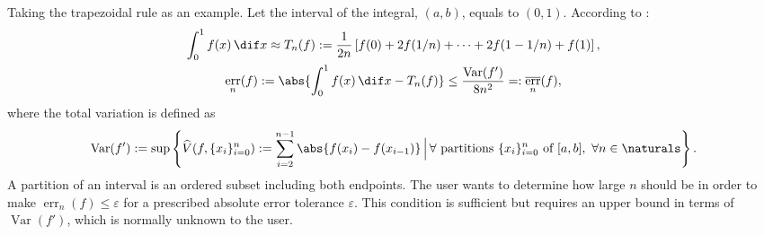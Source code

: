 \documentclass[]{elsarticle}
\DeclareMathOperator{\Var}{Var}
\DeclareMathOperator{\err}{err}
\theoremstyle{definition}
\theoremstyle{remark}
\DeclareMathOperator{\oerr}{\overline{\err}}
\begin{document}
Taking the trapezoidal rule as an example. Let the interval of the integral, $(a,b)$, equals to $(0,1)$. According to \cite[Sect.\ 7.2, (7.15)]{BraPet11a}:
\begin{gather}
\label{traprule}
\int_0^1 f(x) \, \dif x \approx T_n(f):= \frac1{2n} \left[f(0) + 2f(1/n) + \cdots + 2f(1-1/n) + f(1) \right ], \\
\label{traperrbd}
\err_n(f) := \abs{\int_0^1 f(x) \, \dif x - T_n(f)}  \le \frac{\Var(f')}{8 n^2} =: \oerr_n(f),
\end{gather}
where the total variation is defined as
\begin{equation*}
\Var(f') : = \sup \left \{\widehat{V}(f,\{x_i\}_{i=0}^n) := \sum_{i=2}^{n-1}  \abs{f(x_i) - f(x_{i-1})} \, \Big
\vert \,
\forall \text{ partitions }  \{x_i\}_{i=0}^n \text{ of } [a,b], \ \forall n \in \naturals \right \}.
\end{equation*}
A partition of an interval is an ordered subset including both endpoints. The user wants to determine how large $n$ should be in order to make  $\err_n(f)  \le \varepsilon$ for a prescribed
absolute error tolerance $\varepsilon$. This condition is sufficient but requires an upper bound in terms of $\Var(f')$, which is normally unknown to the user.
\end{document}
